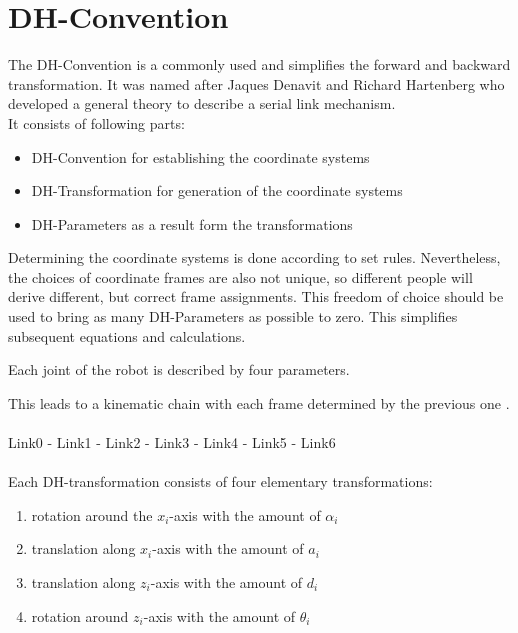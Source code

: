\chapter{\ac{DH}-Convention} \label{sec:DH-convention}

The \ac{DH}-Convention is a commonly used and simplifies the forward and backward transformation. It was named after Jaques Denavit and Richard Hartenberg who developed a general theory to describe a serial link mechanism. \cite{DenavitHartenbergLesson}\\
It consists of following parts:

\begin{itemize}[leftmargin=3cm]
	\item \ac{DH}-Convention for establishing the coordinate systems
	\item \ac{DH}-Transformation for generation of the coordinate systems
	\item \ac{DH}-Parameters as a result form the transformations
\end{itemize}

Determining the coordinate systems is done according to set rules. Nevertheless, the choices of coordinate frames are also not unique, so different people will derive different, but correct frame assignments. This freedom of choice should be used to bring as many \ac{DH}-Parameters as possible to zero. This simplifies subsequent equations and calculations. \cite{DenavitHartenbergKonventionen}

Each joint of the robot is described by four parameters.

This leads to a kinematic chain with each frame determined by the previous one \cite{DenavitHartenbergKonventionen}.\\
\\

Link0 - Link1 - Link2 - Link3 - Link4 - Link5 - Link6\\
\\

Each \ac{DH}-transformation consists of four elementary transformations\cite{DenavitHartenbergKonventionen}:

\begin{enumerate}[label=\emph{\arabic*)}]
	\item rotation around the $x_i$-axis with the amount of $\alpha_i$
	\item translation along $x_i$-axis with the amount of  $a_i$
	\item translation along $z_i$-axis with the amount of  $d_i$
	\item rotation around $z_i$-axis with the amount of  $\theta_i$
\end{enumerate}

